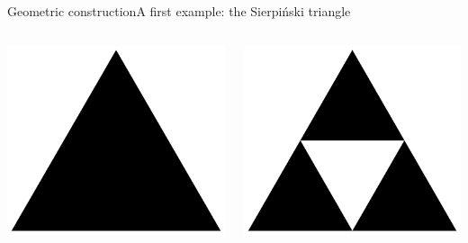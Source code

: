\documentclass[xcolor=x11names,compress,professionalfonts]{beamer}
\renewcommand{\(}{\begin{columns}}
\renewcommand{\)}{\end{columns}}
\newcommand{\<}[1]{\begin{column}{#1}}
\renewcommand{\>}{\end{column}}
\begin{document}
\begin{frame}{Geometric construction}{A first example: the Sierpiński triangle}
\begin{itemize}
\begin{columns}
\newcommand{\s}{.2}
  \begin{column}{3cm}
    \includegraphics[scale=\s]{sierpinksi_triangle_0}
  \end{column}

  \begin{column}{3cm}
     \includegraphics[scale=\s]{sierpinksi_triangle_1}
  \end{column}
  

\end{columns}
\end{itemize}
\end{frame}
\end{document}
